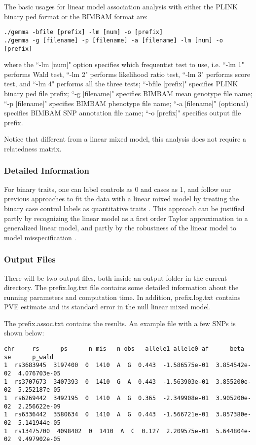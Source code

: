 \documentclass[11pt]{article}
\begin{document}
The basic usages for linear model association analysis with either the PLINK binary ped format or the BIMBAM format are:

\begin{verbatim}
./gemma -bfile [prefix] -lm [num] -o [prefix]
./gemma -g [filename] -p [filename] -a [filename] -lm [num] -o [prefix]
\end{verbatim}

where the ``-lm [num]" option specifies which frequentist test to use,
i.e. ``-lm 1" performs Wald test, ``-lm 2" performs likelihood ratio
test, ``-lm 3" performs score test, and ``-lm 4" performs all the
three tests; ``-bfile [prefix]" specifies PLINK binary ped file
prefix; ``-g [filename]" specifies BIMBAM mean genotype file name;
``-p [filename]" specifies BIMBAM phenotype file name; ``-a
[filename]" (optional) specifies BIMBAM SNP annotation file name; ``-o
[prefix]" specifies output file prefix.

Notice that different from a linear mixed model, this analysis does
not require a relatedness matrix.

\subsubsection{Detailed Information}

For binary traits, one can label controls as 0 and cases as 1, and
follow our previous approaches to fit the data with a linear mixed
model by treating the binary case control labels as quantitative
traits \cite{Zhou:2012, Zhou:2013}. This approach can be justified
partly by recognizing the linear model as a first order Taylor
approximation to a generalized linear model, and partly by the
robustness of the linear model to model misspecification
\cite{Zhou:2013}.

\subsubsection{Output Files}

There will be two output files, both inside an output folder in the
current directory. The prefix.log.txt file contains some detailed
information about the running parameters and computation time. In
addition, prefix.log.txt contains PVE estimate and its standard error
in the null linear mixed model.

The prefix.assoc.txt contains the results. An example file with a few
SNPs is shown below:
%
\begin{verbatim}
chr     rs      ps      n_mis   n_obs   allele1 allele0 af      beta    se      p_wald
1  rs3683945  3197400  0  1410  A  G  0.443  -1.586575e-01  3.854542e-02  4.076703e-05
1  rs3707673  3407393  0  1410  G  A  0.443  -1.563903e-01  3.855200e-02  5.252187e-05
1  rs6269442  3492195  0  1410  A  G  0.365  -2.349908e-01  3.905200e-02  2.256622e-09
1  rs6336442  3580634  0  1410  A  G  0.443  -1.566721e-01  3.857380e-02  5.141944e-05
1  rs13475700  4098402  0  1410  A  C  0.127  2.209575e-01  5.644804e-02  9.497902e-05
\end{verbatim}
%
\end{document}
